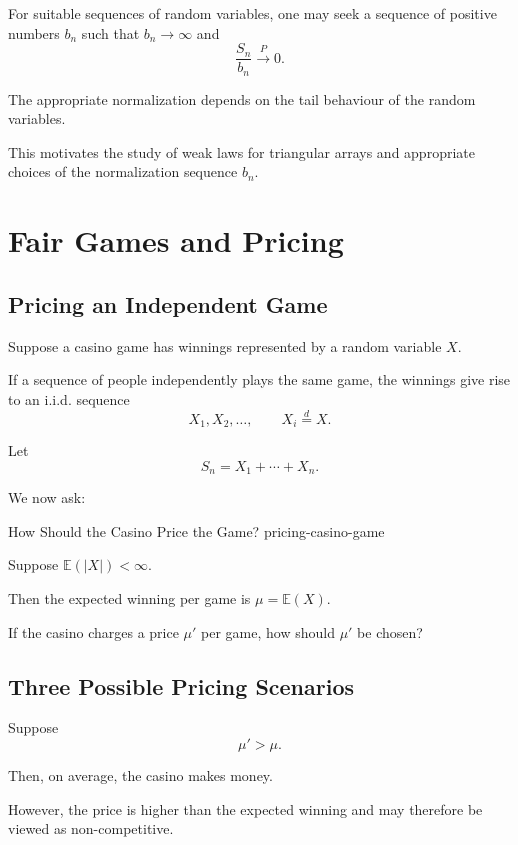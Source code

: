 For suitable sequences of random variables, one may seek a sequence
of positive numbers $b_n$ such that
\(
b_n\longrightarrow\infty
\)
and
\[
\frac{S_n}{b_n}\xrightarrow{P}0.
\]

The appropriate normalization depends on the tail behaviour of the
random variables.

This motivates the study of weak laws for triangular arrays and
appropriate choices of the normalization sequence $b_n$.



\section{Fair Games and Pricing}

\subsection{Pricing an Independent Game}

Suppose a casino game has winnings represented by a random variable
$X$.

If a sequence of people independently plays the same game, the
winnings give rise to an i.i.d. sequence
\[
X_1,X_2,\ldots,
\qquad
X_i\overset{d}{=}X.
\]

Let
\[
S_n=X_1+\cdots+X_n.
\]

We now ask:

\begin{question}{How Should the Casino Price the Game?}
{pricing-casino-game}

Suppose
\(
\mathbb{E}(|X|)<\infty.
\)

Then the expected winning per game is
\(
\mu=\mathbb{E}(X).
\)

If the casino charges a price $\mu'$ per game, how should $\mu'$
be chosen?

\end{question}


\subsection{Three Possible Pricing Scenarios}

Suppose
\[
\mu' > \mu.
\]

Then, on average, the casino makes money.

However, the price is higher than the expected winning and may therefore
be viewed as non-competitive.


